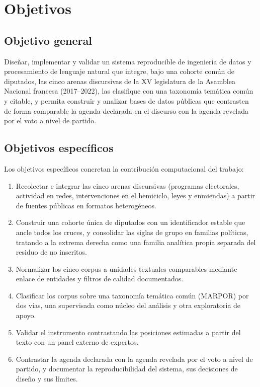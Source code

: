 \section{Objetivos}
\label{sec:objetivos}

\subsection{Objetivo general}
\label{sec:objetivo-general}

Diseñar, implementar y validar un sistema reproducible de ingeniería de datos y
procesamiento de lenguaje natural que integre, bajo una cohorte común de
diputados, las cinco arenas discursivas de la XV legislatura de la Asamblea
Nacional francesa (2017--2022), las clasifique con una taxonomía temática común y
citable, y permita construir y analizar bases de datos públicas que contrasten de
forma comparable la agenda declarada en el discurso con la agenda revelada por el
voto a nivel de partido.

\subsection{Objetivos específicos}
\label{sec:objetivos-especificos}

Los objetivos específicos concretan la contribución computacional del trabajo:

\begin{enumerate}
  \item Recolectar e integrar las cinco arenas discursivas (programas
  electorales, actividad en redes, intervenciones en el hemiciclo, leyes y
  enmiendas) a partir de fuentes públicas en formatos heterogéneos.
  \item Construir una cohorte única de diputados con un identificador estable que
  ancle todos los cruces, y consolidar las siglas de grupo en familias políticas,
  tratando a la extrema derecha como una familia analítica propia separada del
  residuo de no inscritos.
  \item Normalizar los cinco corpus a unidades textuales comparables mediante
  enlace de entidades y filtros de calidad documentados.
  \item Clasificar los corpus sobre una taxonomía temática común (MARPOR) por dos
  vías, una supervisada como núcleo del análisis y otra exploratoria de apoyo.
  \item Validar el instrumento contrastando las posiciones estimadas a partir del
  texto con un panel externo de expertos.
  \item Contrastar la agenda declarada con la agenda revelada por el voto a nivel
  de partido, y documentar la reproducibilidad del sistema, sus decisiones de
  diseño y sus límites.
\end{enumerate}

